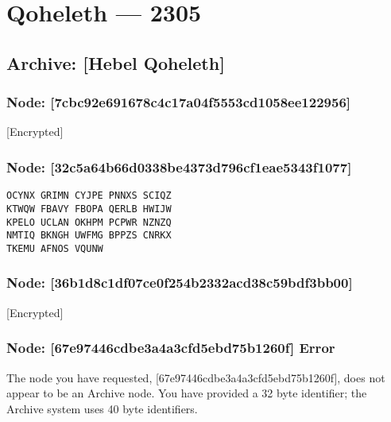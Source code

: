 \hypertarget{qoheleth-2305}{%
\chapter*{Qoheleth — 2305}\label{qoheleth-2305}}

\hypertarget{archive-hebel-qoheleth}{%
\section{Archive: {[}Hebel Qoheleth{]}}\label{archive-hebel-qoheleth}}

\hypertarget{node-7cbc92e691678c4c17a04f5553cd1058ee122956}{%
\subsection{Node: {[}7cbc92e691678c4c17a04f5553cd1058ee122956{]}}\label{node-7cbc92e691678c4c17a04f5553cd1058ee122956}}

{[}Encrypted{]}

\hypertarget{node-32c5a64b66d0338be4373d796cf1eae5343f1077}{%
\subsection{Node: {[}32c5a64b66d0338be4373d796cf1eae5343f1077{]}}\label{node-32c5a64b66d0338be4373d796cf1eae5343f1077}}

\begin{verbatim}
OCYNX GRIMN CYJPE PNNXS SCIQZ
KTWQW FBAVY FBOPA QERLB HWIJW
KPELO UCLAN OKHPM PCPWR NZNZQ
NMTIQ BKNGH UWFMG BPPZS CNRKX
TKEMU AFNOS VQUNW
\end{verbatim}

\hypertarget{node-36b1d8c1df07ce0f254b2332acd38c59bdf3bb00}{%
\subsection{Node: {[}36b1d8c1df07ce0f254b2332acd38c59bdf3bb00{]}}\label{node-36b1d8c1df07ce0f254b2332acd38c59bdf3bb00}}

{[}Encrypted{]}

\hypertarget{node-67e97446cdbe3a4a3cfd5ebd75b1260f-error}{%
\subsection{Node: {[}67e97446cdbe3a4a3cfd5ebd75b1260f{]} Error}\label{node-67e97446cdbe3a4a3cfd5ebd75b1260f-error}}

The node you have requested, {[}67e97446cdbe3a4a3cfd5ebd75b1260f{]}, does not appear to be an Archive node. You have provided a 32 byte identifier; the Archive system uses 40 byte identifiers.

